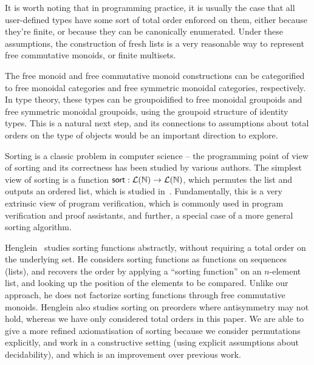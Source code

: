 It is worth noting that in programming practice,
it is usually the case that all user-defined types have some sort of total order enforced on them,
either because they're finite, or because they can be canonically enumerated.
%
Under these assumptions, the construction of fresh lists is a very reasonable way to represent free
commutative monoids, or finite multisets.

The free monoid and free commutative monoid constructions can be categorified
to free monoidal categories and free symmetric monoidal categories, respectively.
%
In type theory, these types can be groupoidified to free monoidal groupoids and free symmetric monoidal groupoids,
using the groupoid structure of identity types.
%
This is a natural next step,
and its connections to assumptions about total orders on the type of objects would be an important direction to explore.

%
Sorting is a classic problem in computer science --
the programming point of view of sorting and its correctness has been studied by various authors.
%
The simplest view of sorting is a function $\operatorname{\mathsf{sort}}: \mathcal{L}(\mathbb{N}) \to \mathcal{L}(\mathbb{N})$,
which permutes the list and outputs an ordered list, which is studied in~\cite{appelVerifiedFunctionalAlgorithms2023}.
%
Fundamentally, this is a very extrinsic view of program verification,
which is commonly used in program verification and proof assistants,
and further, a special case of a more general sorting algorithm.

Henglein~\cite{hengleinWhatSortingFunction2009} studies sorting functions abstractly,
without requiring a total order on the underlying set.
%
He considers sorting functions as functions on sequences (lists),
and recovers the order by applying a ``sorting function'' on an $n$-element list,
and looking up the position of the elements to be compared.
%
Unlike our approach, he does not factorize sorting functions through free commutative monoids.
%
Henglein also studies sorting on preorders where antisymmetry may not hold,
whereas we have only considered total orders in this paper.
%
We are able to give a more refined axiomatisation of sorting because we consider permutations
explicitly, and work in a constructive setting (using explicit assumptions about decidability),
and which is an improvement over previous work.

